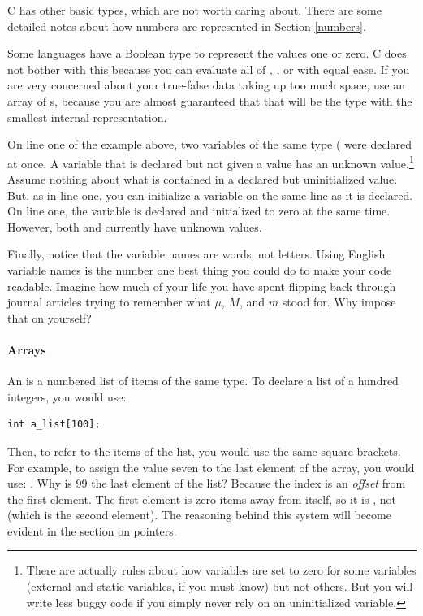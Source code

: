 C has other basic types, which are not worth caring about. There
are some detailed notes about how numbers are represented in Section
\ref{numbers}.

Some languages have a Boolean type to represent the values one or zero.
C does not bother with this because you can
evaluate all of , , or 
with equal ease. If you are very concerned about 
your true-false data taking up too much space, use an array of s,
because you are almost guaranteed that that will be the type with the
smallest internal representation.

On line one of the example above, two variables of the same type
( were declared at once.  A variable that is declared but
not given a value has an unknown value.\footnote{There are actually rules
about how variables are set to zero for some variables (external and
static variables, if you must know) but not others. But you will write
less buggy code if you simply never rely on an uninitialized variable.}
Assume nothing about what is contained in a declared but uninitialized
value. But, as in line one, you can initialize a variable on the same
line as it is declared. On line one, the  variable is declared
and initialized to zero at the same time.  However, both 
and  currently have unknown values.

Finally, notice that the variable names are words, not letters. Using
English variable names is the number one best thing you could do to
make your code readable. Imagine how much of your life you have spent
flipping back through journal articles trying to remember what $\mu$,
$M$, and $m$ stood for. Why impose that on yourself?

\paragraph{Arrays} An  is a numbered list of items of the same type. To declare a list of a hundred
integers, you would use:
\begin{lstlisting}
int a_list[100];
\end{lstlisting}
Then, to refer to the items of the list, you would use the same square
brackets. For example, to assign the value seven to the last element
of the array, you would use: . Why is 99 the last
element of the list? Because the index is an {\sl offset} from the first
element. The first element is zero items away from itself, so it is
, not  (which is the second element).
The reasoning behind this system will become evident in the section
on pointers.

